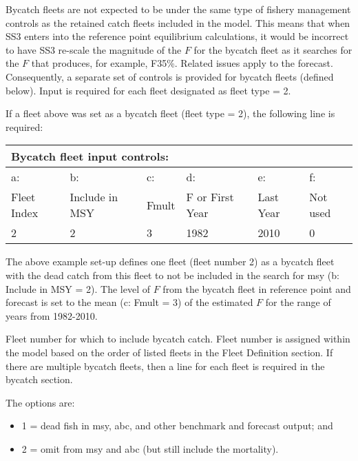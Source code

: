 Bycatch fleets are not expected to be under the same type of fishery management controls as the retained catch fleets included in the model. This means that when SS3 enters into the reference point equilibrium calculations, it would be incorrect to have SS3 re-scale the magnitude of the $F$ for the bycatch fleet as it searches for the $F$ that produces, for example, F35\%. Related issues apply to the forecast. Consequently, a separate set of controls is provided for bycatch fleets (defined below). Input is required for each fleet designated as fleet type = 2.

\noindent If a fleet above was set as a bycatch fleet (fleet type = 2), the following line is required: 
\begin{center}
	\vspace*{-\baselineskip}
	\begin{tabular}{p{2.25cm} p{2.5cm} p{2.25cm} p{2.5cm} p{2.5cm} p{2cm}}

		\multicolumn{6}{l}{Bycatch fleet input controls:} \\
		\hline
		a: 			  & b:  			 & c:    & d:              & e:        & f: \Tstrut\\
		Fleet Index   & Include in MSY   & Fmult & F or First Year & Last Year & Not used \Bstrut\\					
		\hline
		2 & 2 & 3 & 1982 & 2010 & 0 \Tstrut\Bstrut\\
		\hline		
	\end{tabular}
	\leavevmode\tagmcend\tagstructend\par
\end{center}

The above example set-up defines one fleet (fleet number 2) as a bycatch fleet with the dead catch from this fleet to not be included in the search for \gls{msy} (b: Include in MSY = 2). The level of $F$ from the bycatch fleet in reference point and forecast is set to the mean (c: Fmult = 3) of the estimated $F$ for the range of years from 1982-2010.  


Fleet number for which to include bycatch catch. Fleet number is assigned within the model based on the order of listed fleets in the Fleet Definition section. If there are multiple bycatch fleets, then a line for each fleet is required in the bycatch section.


The options are:	  
  \begin{itemize}
  	\item 1 = dead fish in \gls{msy}, \gls{abc}, and other benchmark and forecast output; and
  	\item 2 = omit from \gls{msy} and \gls{abc} (but still include the mortality).
  \end{itemize}

